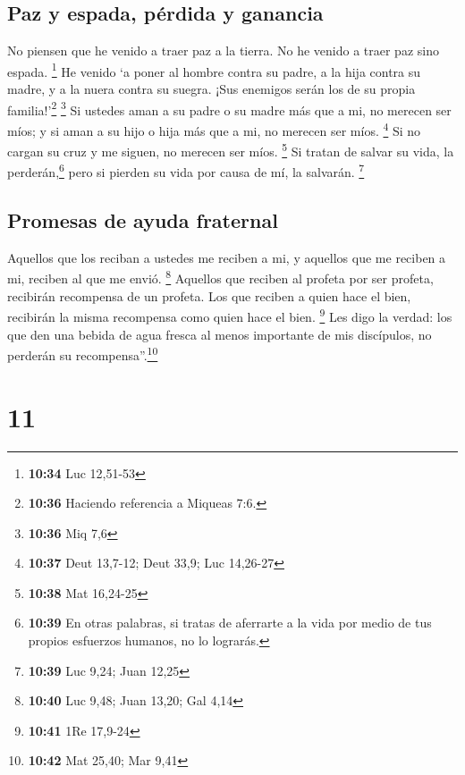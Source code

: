 \hypertarget{paz-y-espada-puxe9rdida-y-ganancia}{%
\subsection{Paz y espada, pérdida y
ganancia}\label{paz-y-espada-puxe9rdida-y-ganancia}}

 No piensen que he venido a traer paz a la tierra. No he
venido a traer paz sino espada. \footnote{\textbf{10:34} Luc 12,51-53}
 He venido `a poner al hombre contra su padre, a la hija
contra su madre, y a la nuera contra su suegra.  ¡Sus
enemigos serán los de su propia familia!'\footnote{\textbf{10:36}
  Haciendo referencia a Miqueas 7:6.} \footnote{\textbf{10:36} Miq 7,6}
 Si ustedes aman a su padre o su madre más que a mi, no
merecen ser míos; y si aman a su hijo o hija más que a mi, no merecen
ser míos. \footnote{\textbf{10:37} Deut 13,7-12; Deut 33,9; Luc 14,26-27}
 Si no cargan su cruz y me siguen, no merecen ser míos.
\footnote{\textbf{10:38} Mat 16,24-25}  Si tratan de
salvar su vida, la perderán,\footnote{\textbf{10:39} En otras palabras,
  si tratas de aferrarte a la vida por medio de tus propios esfuerzos
  humanos, no lo lograrás.} pero si pierden su vida por causa de mí, la
salvarán. \footnote{\textbf{10:39} Luc 9,24; Juan 12,25}

\hypertarget{promesas-de-ayuda-fraternal}{%
\subsection{Promesas de ayuda
fraternal}\label{promesas-de-ayuda-fraternal}}

 Aquellos que los reciban a ustedes me reciben a mi, y
aquellos que me reciben a mi, reciben al que me envió. \footnote{\textbf{10:40}
  Luc 9,48; Juan 13,20; Gal 4,14}  Aquellos que reciben
al profeta por ser profeta, recibirán recompensa de un profeta. Los que
reciben a quien hace el bien, recibirán la misma recompensa como quien
hace el bien. \footnote{\textbf{10:41} 1Re 17,9-24}  Les
digo la verdad: los que den una bebida de agua fresca al menos
importante de mis discípulos, no perderán su recompensa''.\footnote{\textbf{10:42}
  Mat 25,40; Mar 9,41}

\hypertarget{section-10}{%
\section{11}\label{section-10}}

